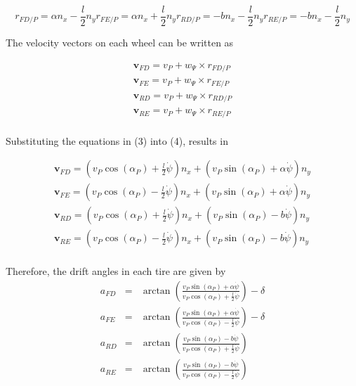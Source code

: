 \documentclass[sublist,a4paper,twoside,11pt]{article}
\begin{document}
\begin{subequations}
	\begin{equation}
	r_{FD/P} = \alpha n_x - \frac{l}{2}n_y
	\end{equation}
	\begin{equation}
		r_{FE/P} = \alpha n_x  + \frac{l}{2}n_y
	\end{equation}
	\begin{equation}
		r_{RD/P} = -b n_x - \frac{l}{2}n_y
	\end{equation}
	\begin{equation}
		r_{RE/P} = -b n_x - \frac{l}{2}n_y
	\end{equation}
\end{subequations}


The velocity vectors on each wheel can be written as

\begin{eqnarray*}
\mathbf{v}_{FD}=v_P+w_\Psi \times r_{FD/P}\\
\mathbf{v}_{FE}=v_P+w_\Psi \times r_{FE/P}\\
\mathbf{v}_{RD}=v_P+w_\Psi \times r_{RD/P}\\
\mathbf{v}_{RE}=v_P+w_\Psi \times r_{RE/P}\\
\end{eqnarray*}


Substituting the equations in (3) into (4), results in 

\begin{eqnarray*}
	\mathbf{v}_{FD}=\left(v_P \cos(\alpha_P) +\frac{l}{2}\dot{\psi}\right)n_x +\left(v_P \sin(\alpha_P) +\alpha \dot{\psi}\right)n_y\\
	\mathbf{v}_{FE}=\left(v_P \cos(\alpha_P) -\frac{l}{2}\dot{\psi}\right)n_x +\left(v_P \sin(\alpha_P) +\alpha \dot{\psi}\right)n_y\\
	\mathbf{v}_{RD}=\left(v_P \cos(\alpha_P) +\frac{l}{2}\dot{\psi}\right)n_x +\left(v_P \sin(\alpha_P) -b \dot{\psi}\right)n_y\\
	\mathbf{v}_{RE}=\left(v_P \cos(\alpha_P) -\frac{l}{2}\dot{\psi}\right)n_x +\left(v_P \sin(\alpha_P) -b \dot{\psi}\right)n_y\\
\end{eqnarray*}


Therefore, the drift angles in each tire are given by	
\begin{eqnarray*}
	a_{FD}&=&\arctan\left(\frac{v_P \sin(\alpha_P) +\alpha \dot{\psi}}{v_P \cos(\alpha_P) +\frac{l}{2}\dot{\psi}}  \right)-\delta \\
	a_{FE}&=&\arctan\left(\frac{v_P \sin(\alpha_P) +\alpha \dot{\psi}}{v_P \cos(\alpha_P) -\frac{l}{2}\dot{\psi}}  \right)-\delta \\
	a_{RD}&=&\arctan\left(\frac{v_P \sin(\alpha_P) -b\dot{\psi}}{v_P \cos(\alpha_P) +\frac{l}{2}\dot{\psi}}  \right)\\
	a_{RE}&=&\arctan\left(\frac{v_P \sin(\alpha_P)  -b\dot{\psi}}{v_P \cos(\alpha_P) -\frac{l}{2}\dot{\psi}}  \right) 
\end{eqnarray*}
\end{document}
